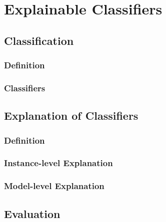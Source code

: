 \chapter{Explainable Classifiers}\label{sec-explainable-classifier}

\section{Classification}


\subsection{Definition}


\subsection{Classifiers}


\section{Explanation of Classifiers}

\subsection{Definition}


\subsection{Instance-level Explanation}

\subsection{Model-level Explanation}

\section{Evaluation}

\newpage